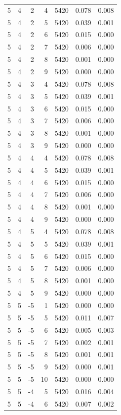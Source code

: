 \begin{table}
\begin{tabular}{rrrrrrr}
5 & 4 & 2 & 4 & 5420 & 0.078 & 0.008 \\
5 & 4 & 2 & 5 & 5420 & 0.039 & 0.001 \\
5 & 4 & 2 & 6 & 5420 & 0.015 & 0.000 \\
5 & 4 & 2 & 7 & 5420 & 0.006 & 0.000 \\
5 & 4 & 2 & 8 & 5420 & 0.001 & 0.000 \\
5 & 4 & 2 & 9 & 5420 & 0.000 & 0.000 \\
5 & 4 & 3 & 4 & 5420 & 0.078 & 0.008 \\
5 & 4 & 3 & 5 & 5420 & 0.039 & 0.001 \\
5 & 4 & 3 & 6 & 5420 & 0.015 & 0.000 \\
5 & 4 & 3 & 7 & 5420 & 0.006 & 0.000 \\
5 & 4 & 3 & 8 & 5420 & 0.001 & 0.000 \\
5 & 4 & 3 & 9 & 5420 & 0.000 & 0.000 \\
5 & 4 & 4 & 4 & 5420 & 0.078 & 0.008 \\
5 & 4 & 4 & 5 & 5420 & 0.039 & 0.001 \\
5 & 4 & 4 & 6 & 5420 & 0.015 & 0.000 \\
5 & 4 & 4 & 7 & 5420 & 0.006 & 0.000 \\
5 & 4 & 4 & 8 & 5420 & 0.001 & 0.000 \\
5 & 4 & 4 & 9 & 5420 & 0.000 & 0.000 \\
5 & 4 & 5 & 4 & 5420 & 0.078 & 0.008 \\
5 & 4 & 5 & 5 & 5420 & 0.039 & 0.001 \\
5 & 4 & 5 & 6 & 5420 & 0.015 & 0.000 \\
5 & 4 & 5 & 7 & 5420 & 0.006 & 0.000 \\
5 & 4 & 5 & 8 & 5420 & 0.001 & 0.000 \\
5 & 4 & 5 & 9 & 5420 & 0.000 & 0.000 \\
5 & 5 & -5 & 1 & 5420 & 0.000 & 0.000 \\
5 & 5 & -5 & 5 & 5420 & 0.011 & 0.007 \\
5 & 5 & -5 & 6 & 5420 & 0.005 & 0.003 \\
5 & 5 & -5 & 7 & 5420 & 0.002 & 0.001 \\
5 & 5 & -5 & 8 & 5420 & 0.001 & 0.001 \\
5 & 5 & -5 & 9 & 5420 & 0.000 & 0.001 \\
5 & 5 & -5 & 10 & 5420 & 0.000 & 0.000 \\
5 & 5 & -4 & 5 & 5420 & 0.016 & 0.004 \\
5 & 5 & -4 & 6 & 5420 & 0.007 & 0.002 \\

\end{tabular}
\end{table}
